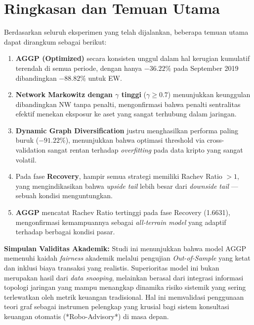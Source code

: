 \documentclass[12pt,a4paper]{article}
\begin{document}
\section{Ringkasan dan Temuan Utama}

Berdasarkan seluruh eksperimen yang telah dijalankan, beberapa temuan utama
dapat dirangkum sebagai berikut:

\begin{enumerate}[leftmargin=2cm]
  \item \textbf{AGGP (Optimized)} secara konsisten unggul dalam hal kerugian
        kumulatif terendah di semua periode, dengan hanya $-36.22\%$ pada
        September 2019 dibandingkan $-88.82\%$ untuk EW.

  \item \textbf{Network Markowitz dengan $\gamma$ tinggi} ($\gamma \geq 0.7$)
        menunjukkan keunggulan dibandingkan NW tanpa penalti, mengonfirmasi
        bahwa penalti sentralitas efektif menekan eksposur ke aset yang sangat
        terhubung dalam jaringan.

  \item \textbf{Dynamic Graph Diversification} justru menghasilkan performa
        paling buruk ($-91.22\%$), menunjukkan bahwa optimasi threshold via
        cross-validation sangat rentan terhadap \emph{overfitting} pada data
        kripto yang sangat volatil.

  \item Pada fase \textbf{Recovery}, hampir semua strategi memiliki Rachev
        Ratio $> 1$, yang mengindikasikan bahwa \emph{upside tail} lebih besar
        dari \emph{downside tail} --- sebuah kondisi menguntungkan.

  \item \textbf{AGGP} mencatat Rachev Ratio tertinggi pada fase Recovery
        (1.6631), mengonfirmasi kemampuannya sebagai \emph{all-terrain model}
        yang adaptif terhadap berbagai kondisi pasar.
\end{enumerate}

\textbf{Simpulan Validitas Akademik:}
Studi ini menunjukkan bahwa model AGGP memenuhi kaidah \textit{fairness} akademik melalui pengujian \textit{Out-of-Sample} yang ketat dan inklusi biaya transaksi yang realistis. Superioritas model ini bukan merupakan hasil dari \textit{data snooping}, melainkan berasal dari integrasi informasi topologi jaringan yang mampu menangkap dinamika risiko sistemik yang sering terlewatkan oleh metrik keuangan tradisional. Hal ini memvalidasi penggunaan teori graf sebagai instrumen pelengkap yang krusial bagi sistem konsultasi keuangan otomatis (*Robo-Advisory*) di masa depan.
\end{document}
